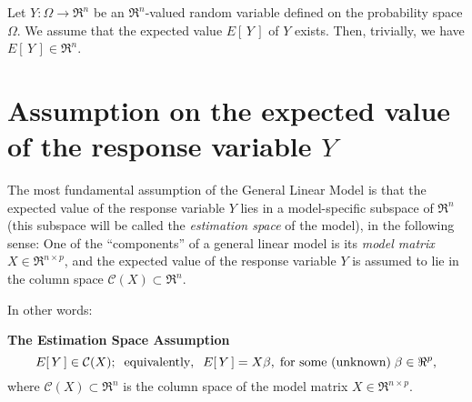 \documentclass{article}
\begin{document}



\pagestyle{fancy}

%

\lfoot[]{}
\cfoot[]{}
\rfoot[]{\thepage}


\noindent
Let $Y : \Omega \longrightarrow \Re^{n}$ be an $\Re^{n}$-valued random variable defined on the probability space $\Omega$.  We assume that the expected value $E[\,Y\,]$ of $Y$ exists.  Then, trivially, we have $E[\,Y\,] \in \Re^{n}$.  

\section{Assumption on the expected value of the response variable $Y$}
\setcounter{theorem}{0}\setcounter{equation}{0}

The most fundamental assumption of the General Linear Model is that the expected value of the response variable $Y$ lies in a model-specific subspace of $\Re^{n}$ (this subspace will be called the \emph{estimation space} of the model), in the following sense:  One of the ``components'' of a general linear model is its \emph{model matrix} $X \in \Re^{n \times p}$, and the expected value of the response variable $Y$ is assumed to lie in the column space $\mathcal{C}(X) \subset \Re^{n}$.

\vskip 0.3cm
\noindent In other words:\vskip 0.1cm
\begin{center}
\begin{minipage}{16cm}
\noindent
\textbf{The Estimation Space Assumption}
\begin{equation}\label{StandardMultivariateLinearModel}
E[\,Y\,] \in \mathcal{C}(X);\;\;\textnormal{equivalently},\;\; E[\,Y\,] = X\beta,\; \textnormal{for some (unknown)}\; \beta \in \Re^{p},
\end{equation}
where $\mathcal{C}(X) \subset \Re^{n}$ is the column space of the model matrix $X \in \Re^{n \times p}$.
\end{minipage}
\end{center}
\end{document}
